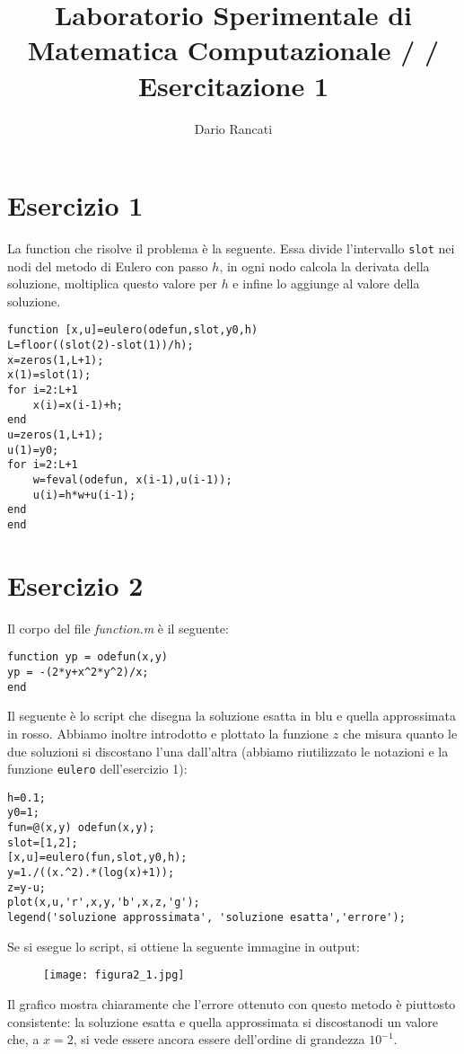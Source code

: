 \documentclass{article}
\title{\textbf{Laboratorio Sperimentale di Matematica Computazionale / / Esercitazione 1}}
\author{Dario Rancati}
\begin{document}
\maketitle


\section*{Esercizio 1}

La function che risolve il problema è la seguente. Essa divide l'intervallo \texttt{slot} nei nodi
del metodo di Eulero con passo $h$, in ogni nodo calcola la derivata della soluzione, 
 moltiplica questo valore per $h$ e infine lo aggiunge al valore della soluzione.

\begin{lstlisting}[style=Matlab-editor]
function [x,u]=eulero(odefun,slot,y0,h)
L=floor((slot(2)-slot(1))/h);
x=zeros(1,L+1);
x(1)=slot(1);
for i=2:L+1
    x(i)=x(i-1)+h;
end
u=zeros(1,L+1);
u(1)=y0;
for i=2:L+1
    w=feval(odefun, x(i-1),u(i-1));
    u(i)=h*w+u(i-1);
end
end
\end{lstlisting}


\section*{Esercizio 2}

Il corpo del file \textit{function.m} è il seguente:
\begin{lstlisting}[style=Matlab-editor]
function yp = odefun(x,y)
yp = -(2*y+x^2*y^2)/x;
end
\end{lstlisting}

\noindent
Il seguente è lo script che disegna la soluzione esatta in blu e quella approssimata in rosso. Abbiamo inoltre introdotto e plottato la funzione $z$ che misura quanto le due soluzioni si discostano l'una dall'altra (abbiamo riutilizzato le notazioni e la funzione \texttt{eulero} dell'esercizio 1):

\begin{lstlisting}[style=Matlab-editor]
h=0.1;
y0=1;
fun=@(x,y) odefun(x,y);
slot=[1,2];
[x,u]=eulero(fun,slot,y0,h);
y=1./((x.^2).*(log(x)+1));
z=y-u;
plot(x,u,'r',x,y,'b',x,z,'g');
legend('soluzione approssimata', 'soluzione esatta','errore');
\end{lstlisting}

\noindent
Se si esegue lo script, si ottiene la seguente immagine in output:

\begin{figure}[!h]
\centering
\texttt{[image: figura2\_1.jpg]}
\end{figure}

\noindent
Il grafico mostra chiaramente che l'errore ottenuto con questo metodo è piuttosto consistente: la soluzione esatta e quella approssimata si discostanodi un valore che, a $x=2$, si vede essere ancora essere dell'ordine di grandezza $10^{-1}$.
\end{document}
